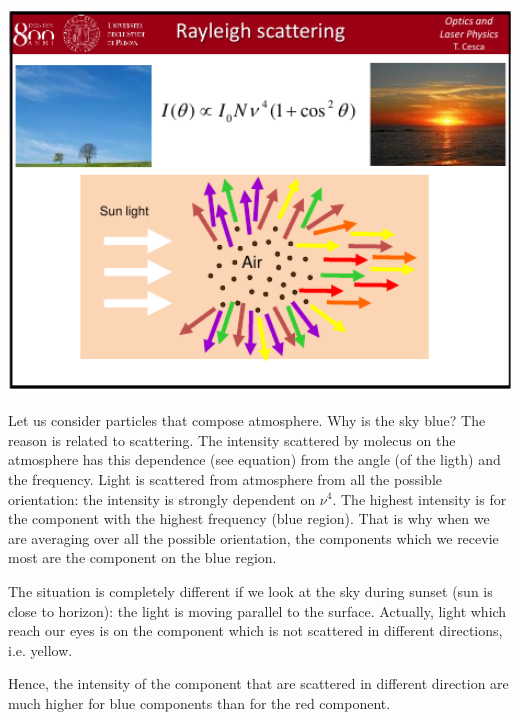 \documentclass[../main/main.tex]{subfiles}
\begin{document}
\begin{minipage}[]{0.5\linewidth}
\centering
\includegraphics[width=1\textwidth]{../lessons/pdf_file/02/02_S15.pdf}
\end{minipage}
\hspace{0.3cm}\vspace{0.3cm}
\begin{minipage}[c]{0.47\linewidth}
Let us consider particles that compose atmosphere. Why is the sky blue? The reason is related to scattering. The intensity scattered by molecus on the atmosphere has this dependence (see equation) from the angle (of the ligth) and the frequency. Light is scattered from atmosphere from all the possible orientation: the intensity is strongly dependent on \( \nu ^4 \). The highest intensity is for the component with the highest frequency (blue region). That is why when we are averaging over all the possible orientation, the components which we recevie most are the component on the blue region.

The situation is completely different if we look at the sky during sunset (sun is close to horizon): the light is moving parallel to the surface. Actually, light which reach our eyes is on the component which is not scattered in different directions, i.e. yellow.

\end{minipage}

Hence, the intensity of the component that are scattered in different direction are much higher for blue components than for the red component.
\end{document}
